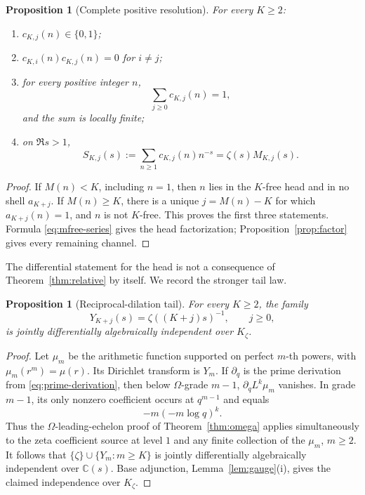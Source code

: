 \documentclass[11pt]{article}
\newtheorem{proposition}[theorem]{Proposition}
\theoremstyle{definition}
\theoremstyle{remark}
\newcommand{\C}{\mathbb C}
\begin{document}
\begin{proposition}[Complete positive resolution]\label{prop:complete-resolution}
For every \(K\geq2\):
\begin{enumerate}[label=\textup{(\roman*)}]
\item \(c_{K,j}(n)\in\{0,1\}\);
\item \(c_{K,i}(n)c_{K,j}(n)=0\) for \(i\ne j\);
\item for every positive integer \(n\),
\[
 \sum_{j\geq0}c_{K,j}(n)=1,
 \tag{6.3}
\]
and the sum is locally finite;
\item on \(\Re s>1\),
\[
 S_{K,j}(s):=\sum_{n\geq1}c_{K,j}(n)n^{-s}
 =\zeta(s)M_{K,j}(s).
 \tag{6.4}
\]
\end{enumerate}
\end{proposition}

\begin{proof}
If \(M(n)<K\), including \(n=1\), then \(n\) lies in the \(K\)-free head and in no shell
\(a_{K+j}\).  If \(M(n)\geq K\), there is a unique \(j=M(n)-K\) for which
\(a_{K+j}(n)=1\), and \(n\) is not \(K\)-free.  This proves the first three statements.
Formula \eqref{eq:mfree-series} gives the head factorization; Proposition~\ref{prop:factor}
gives every remaining channel.
\end{proof}

The differential statement for the head is not a consequence of
Theorem~\ref{thm:relative} by itself.  We record the stronger tail law.

\begin{proposition}[Reciprocal-dilation tail]\label{prop:reciprocal-tail}
For every \(K\geq2\), the family
\[
 Y_{K+j}(s)=\zeta((K+j)s)^{-1},\qquad j\geq0,
 \tag{6.5}
\]
is jointly differentially algebraically independent over \(K_\zeta\).
\end{proposition}

\begin{proof}
Let \(\mu_m\) be the arithmetic function supported on perfect \(m\)-th powers, with
\(\mu_m(r^m)=\mu(r)\).  Its Dirichlet transform is \(Y_m\).  If
\(\partial_q\) is the prime derivation from \eqref{eq:prime-derivation}, then below
\(\Omega\)-grade \(m-1\), \(\partial_qL^k\mu_m\) vanishes.  In grade \(m-1\), its only
nonzero coefficient occurs at \(q^{m-1}\) and equals
\[
 -m(-m\log q)^k.
 \tag{6.6}
\]
Thus the \(\Omega\)-leading-echelon proof of Theorem~\ref{thm:omega} applies simultaneously to
the zeta coefficient source at level \(1\) and any finite collection of the
\(\mu_m\), \(m\geq2\).  It follows that
\(\{\zeta\}\cup\{Y_m:m\geq K\}\) is jointly differentially algebraically independent over
\(\C(s)\).  Base adjunction, Lemma~\ref{lem:gauge}(i), gives the claimed independence over
\(K_\zeta\).
\end{proof}
\end{document}
